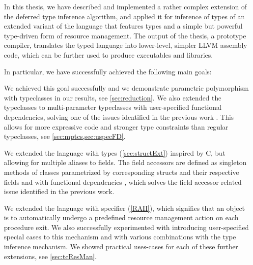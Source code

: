 

In this thesis, we have described and implemented a rather complex extension of the deferred type inference algorithm, and applied it for inference of types of an extended variant of the \cmm language that features types and a simple but powerful type-driven form of resource management. The output of the thesis, a prototype compiler, translates the typed \cmm language into lower-level, simpler LLVM assembly code, which can be further used to produce executables and libraries.

In particular, we have successfully achieved the following main goals:

\begin{description}
    \small
    \item[Extend \cmm with parametric polymorphism with typeclasses] We achieved this goal successfully and we demonstrate parametric polymorphism with typeclasses in our results, see \cref{sec:reduction}. We also extended the typeclasses to multi-parameter typeclasses with user-specified functional dependencies, solving one of the issues identified in the previous work \cite{klepl2020type}. This allows for more expressive code and stronger type constraints than regular typeclasses, see \cref{sec:mptcs,sec:uspecFD}.

    \item[Extend \cmm with record types]  We extended the language with  types (\cref{sec:structExt}) inspired by C, but allowing for multiple aliases to fields. The field accessors are defined as singleton methods of classes parametrized by corresponding structs and their respective fields and with functional dependencies , which solves the field-accessor-related issue identified in the previous work.

    \item[Extend \cmm with automatic resource management features] We extended the language with  specifier (\cref{RAII}), which signifies that an object is to automatically undergo a predefined resource management action on each procedure exit. We also successfully experimented with introducing user-specified special cases to this mechanism and with various combinations with the type inference mechanism. We showed practical uses-cases for each of these further extensions, see \cref{sec:tcResMan}.

    \item[The solution should simplify implementation of low-level software] 


\end{description}
